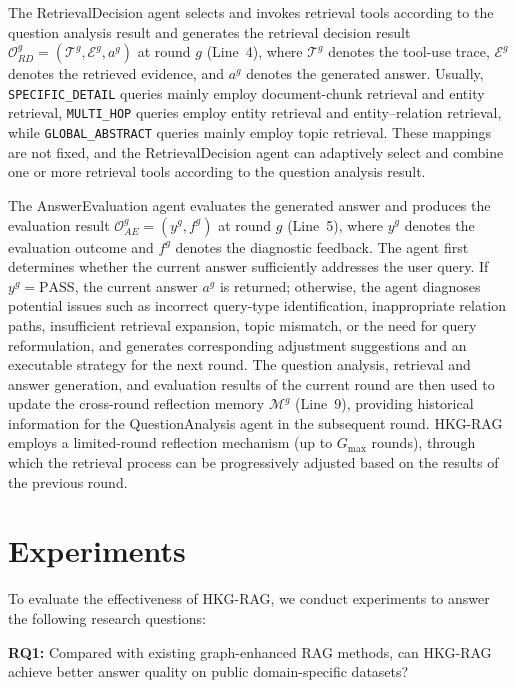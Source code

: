 \documentclass[preprint,12pt,authoryear]{elsarticle}
\begin{document}
The RetrievalDecision agent selects and invokes retrieval tools according to the question analysis result and generates the retrieval decision result $\mathcal{O}_{RD}^{g}=(\mathcal{T}^{g},\mathcal{E}^{g},a^{g})$ at round $g$ (Line~4), where $\mathcal{T}^{g}$ denotes the tool-use trace, $\mathcal{E}^{g}$ denotes the retrieved evidence, and $a^{g}$ denotes the generated answer. Usually, \texttt{SPECIFIC\_DETAIL} queries mainly employ document-chunk retrieval and entity retrieval, \texttt{MULTI\_HOP} queries employ entity retrieval and entity--relation retrieval, while \texttt{GLOBAL\_ABSTRACT} queries mainly employ topic retrieval. These mappings are not fixed, and the RetrievalDecision agent can adaptively select and combine one or more retrieval tools according to the question analysis result.


The AnswerEvaluation agent evaluates the generated answer and produces the evaluation result $\mathcal{O}_{AE}^{g}=(y^{g},f^{g})$ at round $g$ (Line~5), where $y^{g}$ denotes the evaluation outcome and $f^{g}$ denotes the diagnostic feedback. The agent first determines whether the current answer sufficiently addresses the user query. If $y^{g}=\mathrm{PASS}$, the current answer $a^{g}$ is returned; otherwise, the agent diagnoses potential issues such as incorrect query-type identification, inappropriate relation paths, insufficient retrieval expansion, topic mismatch, or the need for query reformulation, and generates corresponding adjustment suggestions and an executable strategy for the next round. The question analysis, retrieval and answer generation, and evaluation results of the current round are then used to update the cross-round reflection memory $\mathcal{M}^{g}$ (Line~9), providing historical information for the QuestionAnalysis agent in the subsequent round. HKG-RAG employs a limited-round reflection mechanism (up to $G_{\max}$ rounds), through which the retrieval process can be progressively adjusted based on the results of the previous round.

\section{Experiments}
\label{sec:experiments}
To evaluate the effectiveness of HKG-RAG, we conduct experiments to answer the following research questions:
%

\textbf{RQ1:} Compared with existing graph-enhanced RAG methods, can HKG-RAG achieve better answer quality on public domain-specific datasets?
\end{document}
